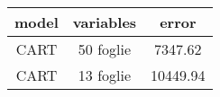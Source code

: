 \begin{table}[tb]
\centering
\begin{tabular}{| c | c | c }
  \hline
model & variables & error \\ 
  \hline
CART & 50  foglie & 7347.62 \\ 
  CART & 13  foglie & 10449.94 \\ 
   \hline
\end{tabular}
\caption{} 
\label{}
\end{table}
